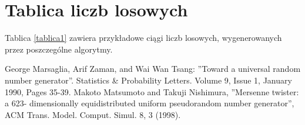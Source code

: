 \documentclass[12pt,a4paper]{article}
\begin{document}
\section{Tablica liczb losowych}
Tablica \ref{tablica1} zawiera przykładowe ciągi liczb losowych, wygenerowanych przez poszczególne algorytmy.

\begin{thebibliography}{9}
  George Marsaglia, Arif Zaman, and Wai Wan Tsang: ''Toward a universal
random number generator''. Statistics \& Probability Letters. Volume 9,
Issue 1, January 1990, Pages 35-39.
  Makoto Matsumoto and Takuji Nishimura, ''Mersenne twister: a 623-
dimensionally equidistributed uniform pseudorandom number generator'',
ACM Trans. Model. Comput. Simul. 8, 3 (1998).
\end{thebibliography}
\end{document}
